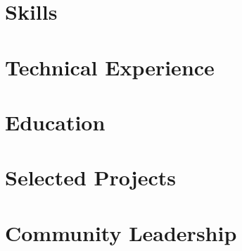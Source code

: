 \documentclass[letter,10pt]{article}
\begin{document}


\section{Skills}


\section{Technical Experience}


\section{Education}



\section{Selected Projects}


\section{Community Leadership}

\end{document}
